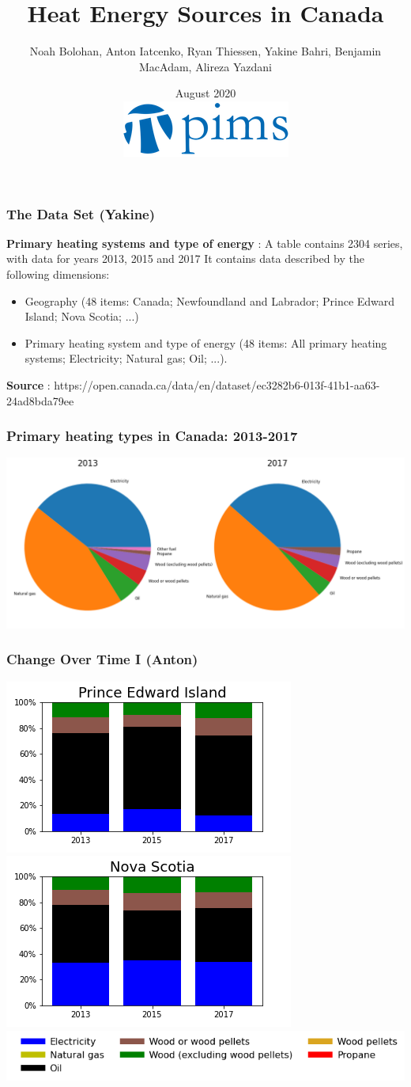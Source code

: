 \documentclass{beamer}
\title{Heat Energy Sources in Canada}
\author{Noah Bolohan, Anton Iatcenko, Ryan Thiessen, Yakine Bahri, Benjamin MacAdam, Alireza Yazdani}
\institute{Math\textsuperscript{Industry}}
\date{August 2020  \\ \vspace{30pt} \includegraphics[scale=0.3]{pims_logo.png} }
\begin{document}
\frame{\titlepage}

\begin{frame}
\frametitle{The Data Set (Yakine)}
\textbf{Primary heating systems and type of energy} : A table contains 2304 series, with data for years 2013, 2015 and 2017
It contains data described by the following dimensions:
\begin{itemize}
\item Geography (48 items: Canada; Newfoundland and Labrador; Prince Edward Island; Nova Scotia; ...)
\item Primary heating system and type of energy (48 items: All primary heating systems; Electricity; Natural gas; Oil; ...).
\end{itemize}
\textbf{Source} : https://open.canada.ca/data/en/dataset/ec3282b6-013f-41b1-aa63-24ad8bda79ee
\end{frame}


\begin{frame}
\frametitle{Primary heating types in Canada: 2013-2017}
\includegraphics[width=\textwidth]{Canada20132017.png}
\end{frame}



\begin{frame}
\frametitle{Change Over Time I (Anton)}
\includegraphics[width=0.5\linewidth]{pe.png}%
\includegraphics[width=0.5\linewidth]{ns.png}\\
\includegraphics[width=\linewidth]{leg_bar.png}
\end{frame}
\end{document}
